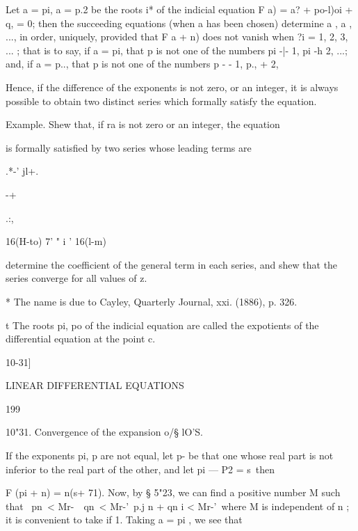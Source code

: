 Let a = pi, a = p.2 be the roots i* of the indicial equation F a) = a?
+ po-l)oi + q, = 0; then the succeeding equations (when a has been
chosen) determine a , a , ..., in order, uniquely, provided that F a +
n) does not vanish when ?i = 1, 2, 3, ... ; that is to say, if a = pi,
that p is not one of the numbers pi -|- 1, pi -h 2, ...; and, if a =
p.., that p is not one of the numbers p - - 1, p., + 2,

Hence, if the difference of the exponents is not zero, or an integer,
it is always possible to obtain two distinct series which formally
satisfy the equation.

Example. Shew that, if ra is not zero or an integer, the equation



is formally satisfied by two series whose leading terms are



.*-' jl+.



-+



.:,



16(H-to) 7' " i ' 16(l-m)

determine the coefficient of the general term in each series, and shew
that the series converge for all values of z.

* The name is due to Cayley, Quarterly Journal, xxi. (1886), p. 326.

t The roots pi, po of the indicial equation are called the expotients
of the differential equation at the point c.



10-31]



LINEAR DIFFERENTIAL EQUATIONS



199



10"31. Convergence of the expansion o/§ lO'S.

If the exponents pi, p are not equal, let p- be that one whose real
part is not inferior to the real part of the other, and let pi — P2 =
s\ then

F (pi + n) = n(s+ 71). Now, by § 5"23, we can find a positive number M
such that \ pn\ < Mr-\ \ qn\ < Mr-'\ p.j n + qn i < Mr-'\ where M is
independent of n ; it is convenient to take if 1. Taking a = pi , we
see that



